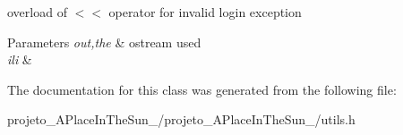 overload of $<$$<$ operator for invalid login exception 


\begin{DoxyParams}{Parameters}
{\em out,the} & ostream used\\
\hline
{\em ili} & \\
\hline
\end{DoxyParams}


The documentation for this class was generated from the following file\+:\begin{DoxyCompactItemize}
\item 
projeto\+\_\+\+A\+Place\+In\+The\+Sun\+\_/projeto\+\_\+\+A\+Place\+In\+The\+Sun\+\_/utils.\+h\end{DoxyCompactItemize}
